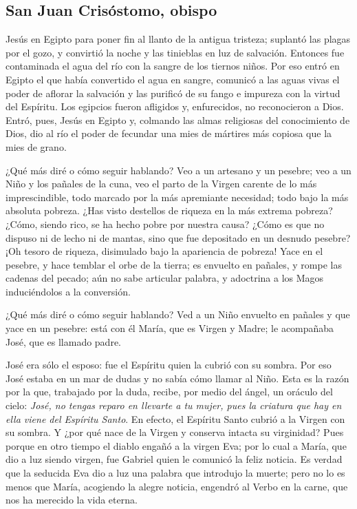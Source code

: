 \subsection{San Juan Crisóstomo, obispo}



\begin{body}
	 Jesús en Egipto para poner fin al llanto de la antigua tristeza; suplantó las plagas por el gozo, y convirtió la noche y las tinieblas en luz de salvación. Entonces fue contaminada el agua del río con la sangre de los tiernos niños. Por eso entró en Egipto el que había convertido el agua en sangre, comunicó a las aguas vivas el poder de aflorar la salvación y las purificó de su fango e impureza con la virtud del Espíritu. Los egipcios fueron afligidos y, enfurecidos, no reconocieron a Dios. Entró, pues, Jesús en Egipto y, colmando las almas religiosas del conocimiento de Dios, dio al río el poder de fecundar una mies de mártires más copiosa que la mies de grano.
	
	¿Qué más diré o cómo seguir hablando? Veo a un artesano y un pesebre; veo a un Niño y los pañales de la cuna, veo el parto de la Virgen carente de lo más imprescindible, todo marcado por la más apremiante necesidad; todo bajo la más absoluta pobreza. ¿Has visto destellos de riqueza en la más extrema pobreza? ¿Cómo, siendo rico, se ha hecho pobre por nuestra causa? ¿Cómo es que no dispuso ni de lecho ni de mantas, sino que fue depositado en un desnudo pesebre? ¡Oh tesoro de riqueza, disimulado bajo la apariencia de pobreza! Yace en el pesebre, y hace temblar el orbe de la tierra; es envuelto en pañales, y rompe las cadenas del pecado; aún no sabe articular palabra, y adoctrina a los Magos induciéndolos a la conversión.
	
	¿Qué más diré o cómo seguir hablando? Ved a un Niño envuelto en pañales y que yace en un pesebre: está con él María, que es Virgen y Madre; le acompañaba José, que es llamado padre.
	
	José era sólo el esposo: fue el Espíritu quien la cubrió con su sombra. Por eso José estaba en un mar de dudas y no sabía cómo llamar al Niño. Esta es la razón por la que, trabajado por la duda, recibe, por medio del ángel, un oráculo del cielo: \emph{José, no tengas reparo en llevarte a tu mujer, pues la criatura que hay en ella viene del Espíritu Santo}. En efecto, el Espíritu Santo cubrió a la Virgen con su sombra. Y ¿por qué nace de la Virgen y conserva intacta su virginidad? Pues porque en otro tiempo el diablo engañó a la virgen Eva; por lo cual a María, que dio a luz siendo virgen, fue Gabriel quien le comunicó la feliz noticia. Es verdad que la seducida Eva dio a luz una palabra que introdujo la muerte; pero no lo es menos que María, acogiendo la alegre noticia, engendró al Verbo en la carne, que nos ha merecido la vida eterna.
\end{body}